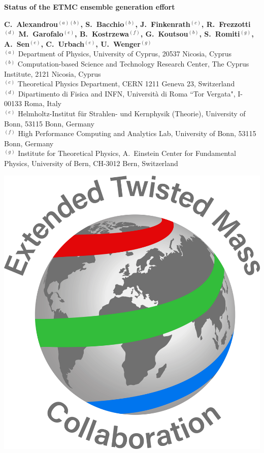 \documentclass[a0,portrait]{a0poster}
\begin{document}
{\VeryHuge \color{NavyBlue} \textbf{Status of the ETMC ensemble generation effort} \color{Black}\\[1.4cm]} %

\begin{minipage}[b]{0.74\linewidth}
    \Large \textbf{C.~Alexandrou$^{(a)(b)}$, S.~Bacchio$^{(b)}$, J.~Finkenrath$^{(c)}$, R.~Frezzotti$^{(d)}$ M.~Garofalo$^{(e)}$, B.~Kostrzewa$^{(f)}$, G.~Koutsou$^{(b)}$, S.~Romiti$^{(g)}$, A.~Sen$^{(e)}$, C.~Urbach$^{(e)}$, U.~Wenger$^{(g)}$}\\[0.5cm] %
    \large $^{(a)}$ Department of Physics, University of Cyprus, 20537 Nicosia, Cyprus\\
    \large $^{(b)}$ Computation-based Science and Technology Research Center, The Cyprus Institute, 2121 Nicosia, Cyprus\\
    \large $^{(c)}$ Theoretical Physics Department, CERN 1211 Geneva 23, Switzerland\\
    \large $^{(d)}$ Dipartimento di Fisica and INFN, Universit\`a di Roma ``Tor Vergata", I-00133 Roma, Italy\\
    \large $^{(e)}$ Helmholtz-Institut f{\"u}r Strahlen- und Kernphysik (Theorie), University of Bonn, 53115 Bonn, Germany\\
    \large $^{(f)}$ High Performance Computing and Analytics Lab, University of Bonn, 53115 Bonn, Germany\\
    \large $^{(g)}$ Institute for Theoretical Physics, A.~Einstein Center for Fundamental Physics, University of Bern, CH-3012 Bern, Switzerland\\
\end{minipage}
%
\begin{minipage}[b]{0.26\linewidth}
    \includegraphics[width=15cm]{figures/Logo_ETMC_RGB.pdf}
\end{minipage}
\end{document}
